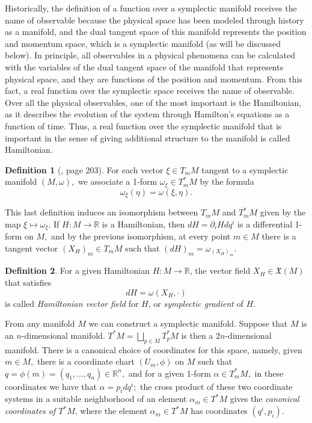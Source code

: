\documentclass[12pt, letterpaper, reqno]{amsart}
\theoremstyle{definition}
\newtheorem{df}{Definition}
\theoremstyle{plain}
\theoremstyle{remark}
\begin{document}
Historically, the definition of a function over a symplectic manifold receives the name of observable because the physical space has been modeled through history as a manifold, and the dual tangent space of this manifold represents the position and momentum space, which is a symplectic manifold (as will be discussed below). In principle, all observables in a physical phenomena can be calculated with the variables of the dual tangent space of the manifold that represents physical space, and they are functions of the position and momentum. From this fact, a real function over the symplectic space receives the name of observable. Over all the physical observables, one of the most important is the Hamiltonian, as it describes the evolution of the system through Hamilton's equations as a function of time. Thus, a real function over the symplectic manifold that is important in the sense of giving additional structure to the manifold is called Hamiltonian.

\begin{df}[\cite{arnol2013mathematical}, page 203]
	For each vector $ \xi\in T_mM  $ tangent to a symplectic manifold $ (M,\omega), $ we associate a 1-form $ \omega_\xi\in T^*_mM $ by the formula $$ \omega_\xi(\eta)=\omega(\xi,\eta). $$  
\end{df}

This last definition induces an isomorphism between $ T_mM $ and $ T^*_mM $ given by the map $ \xi \mapsto \omega_\xi. $ If $ H: M \rightarrow \mathbb{R} $ is a Hamiltonian, then $ dH = \partial_i H dq^i $ is a differential 1-form on $ M, $ and by the previous isomorphism, at every point $ m\in M $ there is a tangent vector $ (X_H)_m \in T_mM $ such that $ (dH)_m = \omega_{(X_H)_m}. $ 

\begin{df}
	For a given Hamiltonian $ H: M \rightarrow \mathbb{R} $, the vector field $ X_H\in \mathfrak{X}(M) $ that satisfies $$ dH = \omega(X_H, \cdot) $$ is called \textit{Hamiltonian vector field} for $ H $, or \textit{symplectic gradient} of $ H. $ 
\end{df}

From any manifold $ M $ we can construct a symplectic manifold. Suppose that $ M $ is an $ n$-dimensional manifold. $ T^*M= \bigsqcup_{p\in M} T^*_p M$ is then a $ 2n $-dimensional manifold. There is a canonical choice of coordinates for this space, namely, given $ m\in M, $ there is a coordinate chart $ (U_m,\phi) $ on $ M $ such that $ q=\phi(m)=(q_1,\dots,q_n)\in \mathbb{R}^n, $ and for a given 1-form $ \alpha\in T_m^*M,$ in these coordinates we have that $ \alpha=p_i dq^i; $ the cross product of these two coordinate systems in a suitable neighborhood of an element $ \alpha_m\in T^*M $ gives the \textit{canonical coordinates of $ T^*M $}, where the element $ \alpha_m\in T^*M $ has coordinates $ (q^i,p_i) $.
\end{document}
